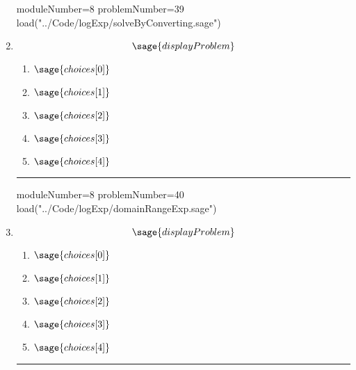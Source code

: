 \documentclass[14pt]{article}
\newcommand{\litem}[1]{\item#1\hspace*{-1cm}\rule{\textwidth}{0.4pt}}
\begin{document}
\begin{enumerate}
\begin{sagesilent}
moduleNumber=8
problemNumber=39
load("../Code/logExp/solveByConverting.sage")
\end{sagesilent}
\litem{ 
\[ \sage{displayProblem} \]
	\begin{enumerate}[label=\Alph*.]
  \item \( \sage{choices[0]} \)
  \item \( \sage{choices[1]} \)
  \item \( \sage{choices[2]} \)
  \item \( \sage{choices[3]} \)
  \item \( \sage{choices[4]} \)
	\end{enumerate}
}

\begin{sagesilent}
moduleNumber=8
problemNumber=40
load("../Code/logExp/domainRangeExp.sage")
\end{sagesilent}

\litem{ 
\[ \sage{displayProblem} \]
	\begin{enumerate}[label=\Alph*.]
  \item \( \sage{choices[0]} \)
  \item \( \sage{choices[1]} \)
  \item \( \sage{choices[2]} \)
  \item \( \sage{choices[3]} \)
  \item \( \sage{choices[4]} \)
	\end{enumerate}
}

\end{enumerate}
\end{document}
